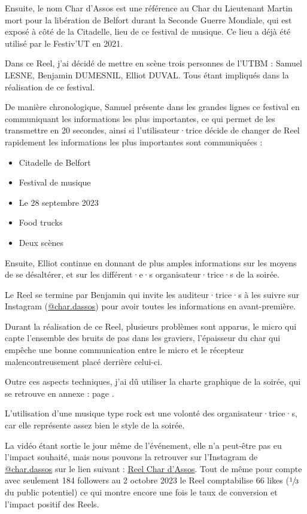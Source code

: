 Ensuite, le nom Char d'Assos est une référence au Char du Lieutenant Martin mort pour la libération de Belfort durant la Seconde Guerre Mondiale, qui est exposé à côté de la Citadelle, lieu de ce festival de musique.
Ce lieu a déjà été utilisé par le Festiv'UT en 2021.

Dans ce Reel, j'ai décidé de mettre en scène trois personnes de l'\gls{UTBM} : Samuel LESNE, Benjamin DUMESNIL, Elliot DUVAL.
Tous étant impliqués dans la réalisation de ce festival.

De manière chronologique, Samuel présente dans les grandes lignes ce festival en communiquant les informations les plus importantes, ce qui permet de les transmettre en 20 secondes, ainsi si l'utilisateur·trice décide de changer de Reel rapidement les informations les plus importantes sont communiquées :
\begin{itemize}
    \item Citadelle de Belfort
    \item Festival de musique
    \item Le 28 septembre 2023
    \item Food trucks
    \item Deux scènes
\end{itemize}

Ensuite, Elliot continue en donnant de plus amples informations sur les moyens de se désaltérer, et sur les différent·e·s organisateur·trice·s de la soirée.

Le Reel se termine par Benjamin qui invite les auditeur·trice·s à les suivre sur Instagram (\href{https://www.instagram.com/char.dassos/}{@char.dassos}) pour avoir toutes les informations en avant-première.

Durant la réalisation de ce Reel, plusieurs problèmes sont apparus, le micro qui capte l'ensemble des bruits de pas dans les graviers, l'épaisseur du char qui empêche une bonne communication entre le micro et le récepteur malencontreusement placé derrière celui-ci.

Outre ces aspects techniques, j'ai dû utiliser la charte graphique de la soirée, qui se retrouve en annexe : page \pageref{subsec:charte-char-dassos}.

L'utilisation d'une musique type rock est une volonté des organisateur·trice·s, car elle représente assez bien le style de la soirée.

La vidéo étant sortie le jour même de l'événement, elle n'a peut-être pas eu l'impact souhaité, mais nous pouvons la retrouver sur l'Instagram de \href{https://www.instagram.com/char.dassos/}{@char.dassos} sur le lien suivant : \href{https://www.instagram.com/reel/Cxuj5g2MKov/?utm_source=ig_web_button_share_sheet&igshid=MzRlODBiNWFlZA==}{Reel Char d'Assos}.
Tout de même pour compte avec seulement 184 followers au 2 octobre 2023 le Reel comptabilise 66 likes ($\sfrac{1}{3}$ du public potentiel) ce qui montre encore une fois le taux de conversion et l'impact positif des Reels.

